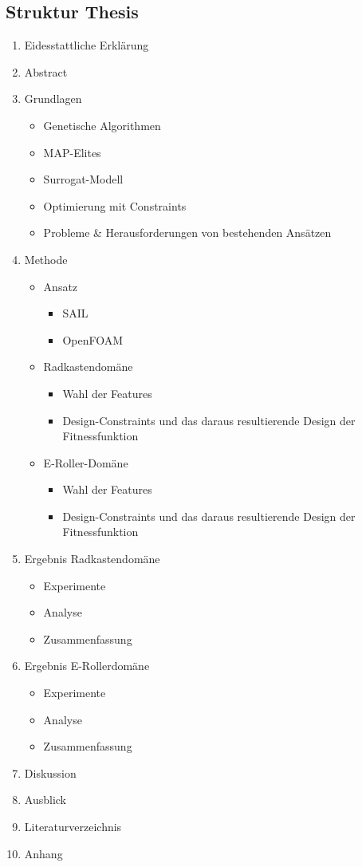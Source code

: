 \documentclass[12pt]{article}
\begin{document}
\begin{appendix}
\section{Struktur Thesis}

\begin{enumerate}
	\item Eidesstattliche Erklärung
	\item Abstract
	\item Grundlagen
	\begin{itemize}
		\item Genetische Algorithmen
		\item MAP-Elites
		\item Surrogat-Modell
		\item Optimierung mit Constraints
		\item Probleme \& Herausforderungen von bestehenden Ansätzen
	\end{itemize}
\item Methode
\begin{itemize}
	\item Ansatz
	\begin{itemize}
		\item SAIL
		\item OpenFOAM
	\end{itemize}
	\item Radkastendomäne
	\begin{itemize}
		\item Wahl der Features
		\item Design-Constraints und das daraus resultierende Design der Fitnessfunktion
	\end{itemize}
	\item E-Roller-Domäne
	\begin{itemize}
		\item Wahl der Features
		\item Design-Constraints und das daraus resultierende Design der Fitnessfunktion
	\end{itemize}
\end{itemize}
\item Ergebnis Radkastendomäne
\begin{itemize}
	\item Experimente
	\item Analyse
	\item Zusammenfassung
\end{itemize}
\item Ergebnis E-Rollerdomäne
\begin{itemize}
	\item Experimente
	\item Analyse
	\item Zusammenfassung
\end{itemize}
\item Diskussion
\item Ausblick
\item Literaturverzeichnis
\item Anhang
\end{enumerate}


\end{appendix}
\end{document}
